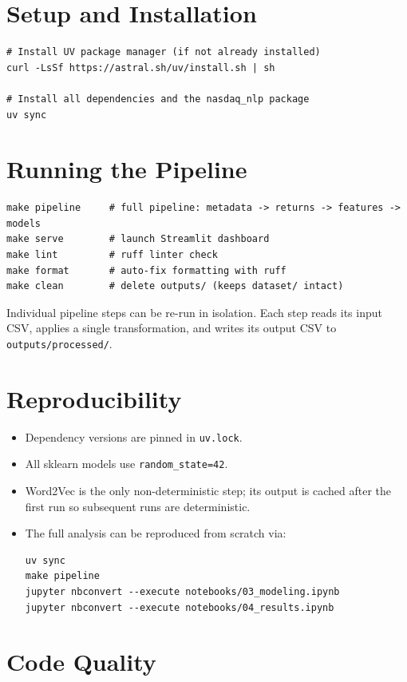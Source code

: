 \documentclass[12pt,a4paper]{article}
\begin{document}
\section{Setup and Installation}

\begin{verbatim}
# Install UV package manager (if not already installed)
curl -LsSf https://astral.sh/uv/install.sh | sh

# Install all dependencies and the nasdaq_nlp package
uv sync
\end{verbatim}

\section{Running the Pipeline}

\begin{verbatim}
make pipeline     # full pipeline: metadata -> returns -> features -> models
make serve        # launch Streamlit dashboard
make lint         # ruff linter check
make format       # auto-fix formatting with ruff
make clean        # delete outputs/ (keeps dataset/ intact)
\end{verbatim}

Individual pipeline steps can be re-run in isolation.
Each step reads its input CSV, applies a single transformation, and writes its
output CSV to \texttt{outputs/processed/}.

\section{Reproducibility}

\begin{itemize}
  \item Dependency versions are pinned in \texttt{uv.lock}.
  \item All sklearn models use \texttt{random\_state=42}.
  \item Word2Vec is the only non-deterministic step; its output is cached after
        the first run so subsequent runs are deterministic.
  \item The full analysis can be reproduced from scratch via:
\begin{verbatim}
uv sync
make pipeline
jupyter nbconvert --execute notebooks/03_modeling.ipynb
jupyter nbconvert --execute notebooks/04_results.ipynb
\end{verbatim}
\end{itemize}

\section{Code Quality}
\end{document}
